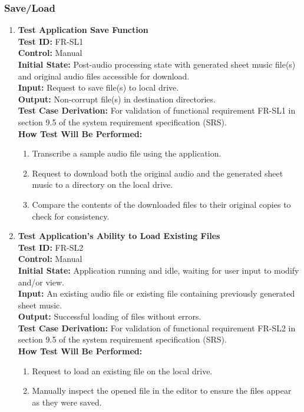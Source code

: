 \documentclass[12pt, titlepage]{article}
\begin{document}
  \subsubsection{Save/Load}
  \begin{enumerate}
    \item \textbf{Test Application Save Function} \\
      \newline
      \textbf{Test ID:} FR-SL1 \\
      \textbf{Control:} Manual \\
      \textbf{Initial State:} Post-audio processing state with generated sheet music file(s) and original audio files accessible for download. \\
      \textbf{Input:} Request to save file(s) to local drive. \\
      \textbf{Output:} Non-corrupt file(s) in destination directories. \\
      \textbf{Test Case Derivation:} For validation of functional requirement FR-SL1 in section 9.5 of the system requirement specification (SRS). \\
      \textbf{How Test Will Be Performed:}
      \begin{enumerate}
          \item Transcribe a sample audio file using the application.
          \item Request to download both the original audio and the generated sheet music to a directory on the local drive.
          \item Compare the contents of the downloaded files to their original copies to check for consistency.
      \end{enumerate}
    
    \item \textbf{Test Application’s Ability to Load Existing Files} \\
      \newline
      \textbf{Test ID:} FR-SL2 \\
      \textbf{Control:} Manual \\
      \textbf{Initial State:} Application running and idle, waiting for user input to modify and/or view. \\
      \textbf{Input:} An existing audio file or existing file containing previously generated sheet music. \\
      \textbf{Output:} Successful loading of files without errors. \\
      \textbf{Test Case Derivation:} For validation of functional requirement FR-SL2 in section 9.5 of the system requirement specification (SRS). \\
      \textbf{How Test Will Be Performed:}
      \begin{enumerate}
          \item Request to load an existing file on the local drive.
          \item Manually inspect the opened file in the editor to ensure the files appear as they were saved.
      \end{enumerate}
  \end{enumerate}
\end{document}
